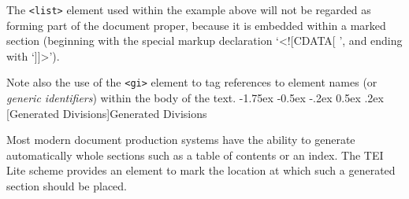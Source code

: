 \documentclass[11pt,twoside]{article}\makeatletter
\makeatletter
\renewcommand\section{\@startsection {section}{1}{\z@}%
     {-1.75ex \@plus -0.5ex \@minus -.2ex}%
     {0.5ex \@plus .2ex}%
     {\reset@font\Large\bfseries\sffamily}}
\renewcommand\subsection{\@startsection{subsection}{2}{\z@}%
     {-1.75ex\@plus -0.5ex \@minus- .2ex}%
     {0.5ex \@plus .2ex}%
     {\reset@font\Large\sffamily}}
\def\DivII{\subsection}
\def\DivII{\section}
\makeatother
\begin{document}
\par
The \texttt{<list>} element used within the example above will not be regarded as forming part of the document proper, because it is embedded within a marked section (beginning with the special markup declaration ‘<![CDATA[ ’, and ending with ‘]]>’).\par
Note also the use of the \texttt{<gi>} element to tag references to element names (or \emph{generic identifiers}) within the body of the text.
\DivII[Generated Divisions]{Generated Divisions}\par
Most modern document production systems have the ability to generate automatically whole sections such as a table of contents or an index. The TEI Lite scheme provides an element to mark the location at which such a generated section should be placed. \par
\end{document}
